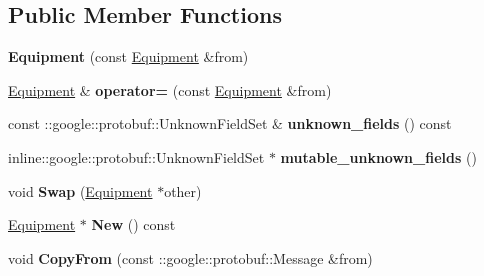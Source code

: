 \subsection*{Public Member Functions}
\begin{DoxyCompactItemize}
\item 
\hypertarget{classexercise__protobuf_1_1_equipment_a15a46b44fbeb733ae519e0168c83b09e}{}{\bfseries Equipment} (const \hyperlink{classexercise__protobuf_1_1_equipment}{Equipment} \&from)\label{classexercise__protobuf_1_1_equipment_a15a46b44fbeb733ae519e0168c83b09e}

\item 
\hypertarget{classexercise__protobuf_1_1_equipment_a5f2af2e5770332e1c06b32113c5f9f1d}{}\hyperlink{classexercise__protobuf_1_1_equipment}{Equipment} \& {\bfseries operator=} (const \hyperlink{classexercise__protobuf_1_1_equipment}{Equipment} \&from)\label{classexercise__protobuf_1_1_equipment_a5f2af2e5770332e1c06b32113c5f9f1d}

\item 
\hypertarget{classexercise__protobuf_1_1_equipment_ac5015943deab60d649526b752273d169}{}const \+::google\+::protobuf\+::\+Unknown\+Field\+Set \& {\bfseries unknown\+\_\+fields} () const \label{classexercise__protobuf_1_1_equipment_ac5015943deab60d649526b752273d169}

\item 
\hypertarget{classexercise__protobuf_1_1_equipment_a3bce73a5183112dc976709f2bbfe820c}{}inline\+::google\+::protobuf\+::\+Unknown\+Field\+Set $\ast$ {\bfseries mutable\+\_\+unknown\+\_\+fields} ()\label{classexercise__protobuf_1_1_equipment_a3bce73a5183112dc976709f2bbfe820c}

\item 
\hypertarget{classexercise__protobuf_1_1_equipment_af7393bf7eaa3be2e73c3d251ba29842a}{}void {\bfseries Swap} (\hyperlink{classexercise__protobuf_1_1_equipment}{Equipment} $\ast$other)\label{classexercise__protobuf_1_1_equipment_af7393bf7eaa3be2e73c3d251ba29842a}

\item 
\hypertarget{classexercise__protobuf_1_1_equipment_ad63093acbdcc73dcc1f584a1779517b8}{}\hyperlink{classexercise__protobuf_1_1_equipment}{Equipment} $\ast$ {\bfseries New} () const \label{classexercise__protobuf_1_1_equipment_ad63093acbdcc73dcc1f584a1779517b8}

\item 
\hypertarget{classexercise__protobuf_1_1_equipment_a8e35d1a0ea5bb7f51b7ad786040f2fc3}{}void {\bfseries Copy\+From} (const \+::google\+::protobuf\+::\+Message \&from)\label{classexercise__protobuf_1_1_equipment_a8e35d1a0ea5bb7f51b7ad786040f2fc3}


\end{DoxyCompactItemize}
